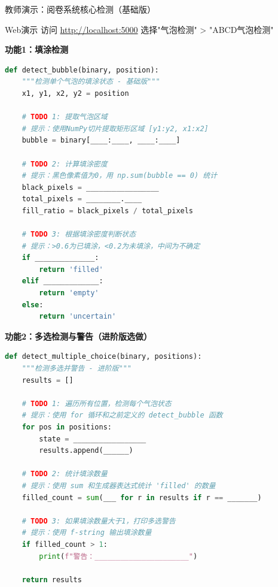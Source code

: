 \begin{frame}[fragile]{教师演示：阅卷系统核心检测（基础版）}
	\begin{alertblock}{Web演示}
		访问 \url{http://localhost:5000} 选择"气泡检测" > "ABCD气泡检测"
	\end{alertblock}

	\textbf{功能1：填涂检测}
	\begin{lstlisting}[language=Python, basicstyle=\ttfamily\tiny]
def detect_bubble(binary, position):
    """检测单个气泡的填涂状态 - 基础版"""
    x1, y1, x2, y2 = position

    # TODO 1: 提取气泡区域
    # 提示：使用NumPy切片提取矩形区域 [y1:y2, x1:x2]
    bubble = binary[____:____, ____:____]

    # TODO 2: 计算填涂密度
    # 提示：黑色像素值为0，用 np.sum(bubble == 0) 统计
    black_pixels = _________________
    total_pixels = ________.____
    fill_ratio = black_pixels / total_pixels

    # TODO 3: 根据填涂密度判断状态
    # 提示：>0.6为已填涂，<0.2为未填涂，中间为不确定
    if ______________:
        return 'filled'
    elif _____________:
        return 'empty'
    else:
        return 'uncertain'
	\end{lstlisting}

	\vspace{0.2cm}
	\textbf{功能2：多选检测与警告（进阶版选做）}
	\begin{lstlisting}[language=Python, basicstyle=\ttfamily\tiny]
def detect_multiple_choice(binary, positions):
    """检测多选并警告 - 进阶版"""
    results = []

    # TODO 1: 遍历所有位置，检测每个气泡状态
    # 提示：使用 for 循环和之前定义的 detect_bubble 函数
    for pos in positions:
        state = _________________
        results.append(______)

    # TODO 2: 统计填涂数量
    # 提示：使用 sum 和生成器表达式统计 'filled' 的数量
    filled_count = sum(___ for r in results if r == _______)

    # TODO 3: 如果填涂数量大于1，打印多选警告
    # 提示：使用 f-string 输出填涂数量
    if filled_count > 1:
        print(f"警告：______________________")

    return results
	\end{lstlisting}
\end{frame}

